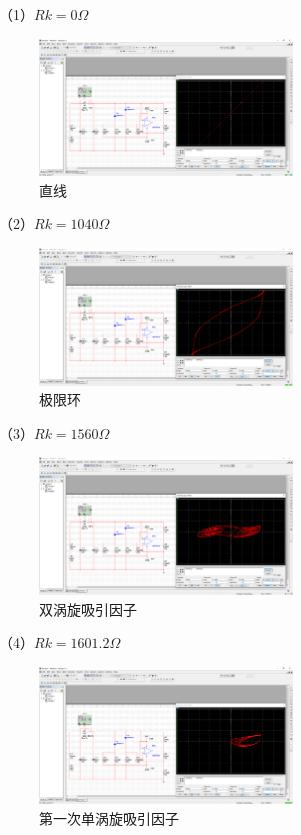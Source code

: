 \documentclass[10pt,a4paper,twoside,UTF8]{ctexart}
\begin{document}
（1）$Rk=0\Omega$
\begin{figure}[H]
	\centering
	\includegraphics[width=0.6\textwidth]{Mulitisim/line.PNG}
	\caption{直线}	
\end{figure}
（2）$Rk=1040\Omega$
\begin{figure}[H]
	\centering
	\includegraphics[width=0.6\textwidth]{Mulitisim/limit ring.PNG}
	\caption{极限环}	
\end{figure}
（3）$Rk=1560\Omega$
\begin{figure}[H]
	\centering
	\includegraphics[width=0.6\textwidth]{Mulitisim/double-attractor.PNG}
	\caption{双涡旋吸引因子}	
\end{figure}
（4）$Rk=1601.2\Omega$
\begin{figure}[H]
	\centering
	\includegraphics[width=0.6\textwidth]{Mulitisim/1st.PNG}
	\caption{第一次单涡旋吸引因子}	
\end{figure}
\end{document}
